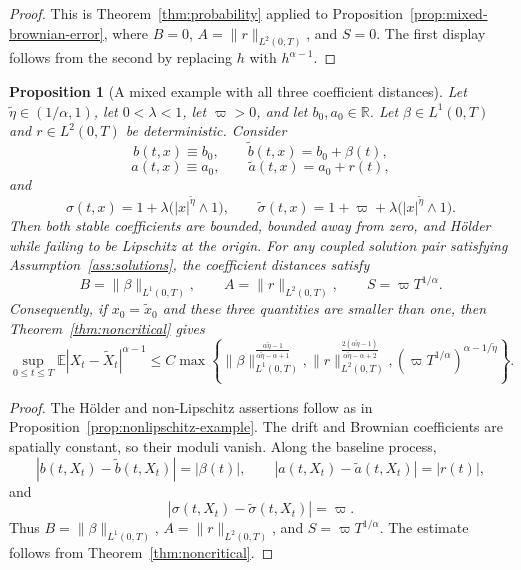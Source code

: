 \documentclass[10pt,a4paper]{amsart}
\newtheorem{proposition}[theorem]{Proposition}
\newcommand{\R}{\mathbb{R}}
\newcommand{\E}{\mathbb{E}}
\newcommand{\1}{\mathbf{1}}
\newcommand{\wt}{\tilde}
\begin{document}
\begin{proof}
This is Theorem~\ref{thm:probability} applied to Proposition~\ref{prop:mixed-brownian-error}, where $B=0$, $A=\|r\|_{L^2(0,T)}$, and $S=0$. The first display follows from the second by replacing $h$ with $h^{\alpha-1}$.
\end{proof}

\begin{proposition}[A mixed example with all three coefficient distances]\label{prop:all-errors-example}
Let $\wt\eta\in(1/\alpha,1)$, let $0<\lambda<1$, let $\varpi>0$, and let $b_0,a_0\in\R$. Let $\beta\in L^1(0,T)$ and $r\in L^2(0,T)$ be deterministic. Consider
\[
  b(t,x)\equiv b_0,
  \qquad
  \wt b(t,x)=b_0+\beta(t),
\]
\[
  a(t,x)\equiv a_0,
  \qquad
  \wt a(t,x)=a_0+r(t),
\]
and
\[
  \sigma(t,x)=1+\lambda\bigl(|x|^{\wt\eta}\wedge1\bigr),
  \qquad
  \wt\sigma(t,x)=1+\varpi+\lambda\bigl(|x|^{\wt\eta}\wedge1\bigr).
\]
Then both stable coefficients are bounded, bounded away from zero, and H\"older while failing to be Lipschitz at the origin. For any coupled solution pair satisfying Assumption~\ref{ass:solutions}, the coefficient distances satisfy
\[
  B=\|\beta\|_{L^1(0,T)},
  \qquad
  A=\|r\|_{L^2(0,T)},
  \qquad
  S=\varpi T^{1/\alpha}.
\]
Consequently, if $x_0=\wt x_0$ and these three quantities are smaller than one, then Theorem~\ref{thm:noncritical} gives
\[
\sup_{0\le t\le T}\E|X_t-\wt X_t|^{\alpha-1}
\le C\max\left\{
\|\beta\|_{L^1(0,T)}^{\frac{\alpha\wt\eta-1}{\alpha\wt\eta-\alpha+1}},
\|r\|_{L^2(0,T)}^{\frac{2(\alpha\wt\eta-1)}{\alpha\wt\eta-\alpha+2}},
(\varpi T^{1/\alpha})^{\alpha-1/\wt\eta}
\right\}.
\]
\end{proposition}

\begin{proof}
The H\"older and non-Lipschitz assertions follow as in Proposition~\ref{prop:nonlipschitz-example}. The drift and Brownian coefficients are spatially constant, so their moduli vanish. Along the baseline process,
\[
  |b(t,X_t)-\wt b(t,X_t)|=|\beta(t)|,
  \qquad
  |a(t,X_t)-\wt a(t,X_t)|=|r(t)|,
\]
and
\[
  |\sigma(t,X_t)-\wt\sigma(t,X_t)|=\varpi.
\]
Thus $B=\|\beta\|_{L^1(0,T)}$, $A=\|r\|_{L^2(0,T)}$, and $S=\varpi T^{1/\alpha}$. The estimate follows from Theorem~\ref{thm:noncritical}.
\end{proof}
\end{document}
